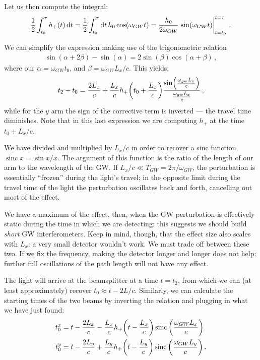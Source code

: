 \documentclass[main.tex]{subfiles}
\begin{document}
Let us then compute the integral: 
%
\begin{align}
\frac{1}{2} \int_{t_0 }^{\tau } h_+ (t) \dd{t} = \frac{1}{2} \int_{t_0 }^{\tau } \dd{t} h_0 \cos(\omega_{GW}t) = 
\frac{h_0 }{2 \omega_{GW}} \eval{\sin(\omega_{GW} t)}_{t=t_0 }^{t = \tau } 
\,.
\end{align}

We can simplify the expression making use of the trigonometric relation 
%
\begin{align}
\sin(\alpha + 2 \beta ) - \sin(\alpha ) = 2 \sin(\beta ) \cos(\alpha + \beta )
\,,
\end{align}
%
where our \(\alpha = \omega_{GW} t_0 \), and \(\beta = \omega_{GW} L_x / c\).
This yields:
%
\begin{align}
t_2 - t_0 = \frac{2L_x}{c} + \frac{L_x}{c} h_{+} \qty(t_0 + \frac{L_x}{c}) \frac{\sin(\frac{\omega_{gw} L_x}{c})}{\frac{\omega_{gw}L_x}{c}}
\,,
\end{align}
%
while for the \(y\) arm the sign of the corrective term is inverted --- the travel time diminishes. 
Note that in this last expression we are computing \(h_+\) at the time \(t_0 + L_x / c\). 

We have divided and multiplied by \(L_x / c\) in order to recover a sinc function, \(\operatorname{sinc} x = \sin x / x\).
The argument of this function is the ratio of the length of our arm to the wavelength of the GW. 
If \(L_x / c \ll T_{GW} = 2 \pi / \omega_{GW}\), the perturbation is essentially ``frozen'' during the light's travel; in the opposite limit during the travel time of the light the perturbation oscillates back and forth, cancelling out most of the effect.

We have a maximum of the effect, then, when the GW perturbation is effectively static during the time in which we are detecting: this suggests we should build \emph{short} GW interferometers. 
Keep in mind, though, that the effect size also scales with \(L_x\): a very small detector wouldn't work. 
We must trade off between these two. 
If we fix the frequency, making the detector longer and longer does not help: further full oscillations of the path length will not have any effect.

The light will arrive at the beamsplitter at a time \(t = t_2 \), from which we can (at least approximately) recover \(t_0 \approx t - 2L /c \).
Similarly, we can calculate the starting times of the two beams by inverting the relation and plugging in what we have just found: 
%
\begin{align}
t_0^{x} &= t - \frac{2L_x}{c} - \frac{L_x}{c} h_{+} \qty(t - \frac{L_x}{c}) \operatorname{sinc} \qty( \frac{\omega_{GW} L_x}{c}) \\
t_0^{y} &= t - \frac{2L_y}{c} + \frac{L_y}{c} h_{+} \qty(t - \frac{L_y}{c}) \operatorname{sinc} \qty( \frac{\omega_{GW} L_y}{c})
\,.
\end{align}
\end{document}
